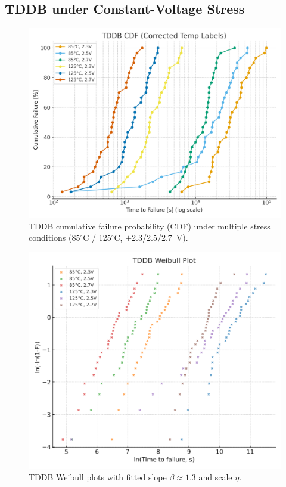 \documentclass[conference]{IEEEtran}
\begin{document}
\subsection{TDDB under Constant-Voltage Stress}
\begin{figure}[!t]
  \centering
  \includegraphics[width=0.95\linewidth]{figures/fig4_tddb_cdf.png}
  \caption{TDDB cumulative failure probability (CDF) under multiple stress conditions (85$^\circ$C / 125$^\circ$C, $\pm$2.3/2.5/2.7~V).}
  \label{fig:tddb_cdf}
\end{figure}

\begin{figure}[!t]
  \centering
  \includegraphics[width=0.95\linewidth]{figures/fig4_tddb_weibull.png}
  \caption{TDDB Weibull plots with fitted slope $\beta \approx 1.3$ and scale $\eta$.}
  \label{fig:tddb_weibull}
\end{figure}
\end{document}
